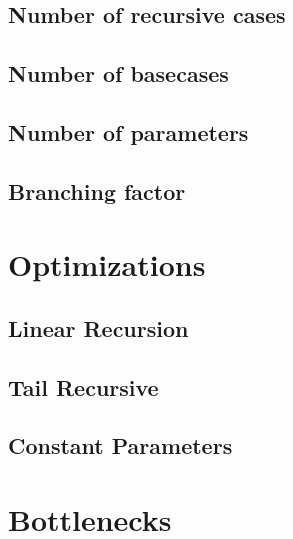 \subsection{Number of recursive cases}
\subsection{Number of basecases}
\subsection{Number of parameters}
\subsection{Branching factor}

\section{Optimizations}
\subsection{Linear Recursion}
\subsection{Tail Recursive}
\subsection{Constant Parameters}

\section{Bottlenecks}